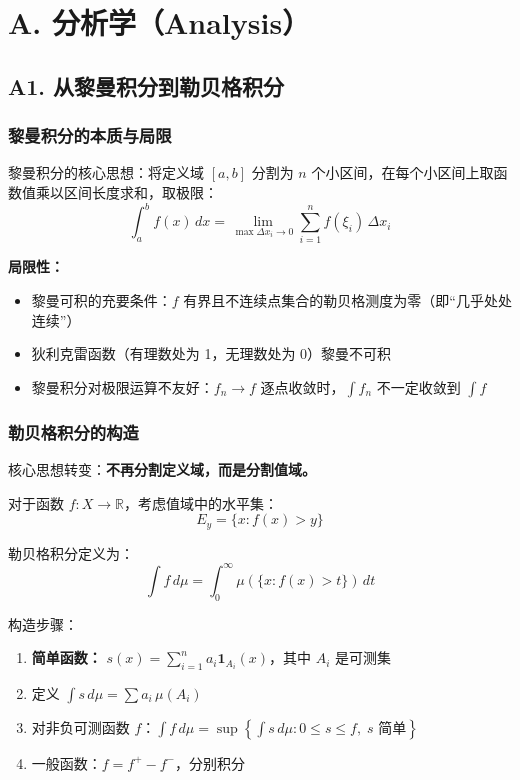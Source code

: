 \section{A. 分析学（Analysis）}

\subsection{A1. 从黎曼积分到勒贝格积分}

\subsubsection{黎曼积分的本质与局限}

黎曼积分的核心思想：将定义域 $[a,b]$ 分割为 $n$ 个小区间，在每个小区间上取函数值乘以区间长度求和，取极限：
\[
\int_a^b f(x)\,dx = \lim_{\max \Delta x_i \to 0} \sum_{i=1}^n f(\xi_i)\,\Delta x_i
\]

\textbf{局限性：}
\begin{itemize}
  \item 黎曼可积的充要条件：$f$ 有界且不连续点集合的勒贝格测度为零（即“几乎处处连续”）
  \item 狄利克雷函数（有理数处为 1，无理数处为 0）黎曼不可积
  \item 黎曼积分对极限运算不友好：$f_n \to f$ 逐点收敛时，$\int f_n$ 不一定收敛到 $\int f$
\end{itemize}

\subsubsection{勒贝格积分的构造}

核心思想转变：\textbf{不再分割定义域，而是分割值域。}

对于函数 $f: X \to \mathbb{R}$，考虑值域中的水平集：
\[
E_y = \{x : f(x) > y\}
\]

勒贝格积分定义为：
\[
\int f\,d\mu = \int_0^\infty \mu(\{x: f(x) > t\})\,dt
\]

构造步骤：
\begin{enumerate}
  \item \textbf{简单函数：} $s(x) = \sum_{i=1}^n a_i \mathbf{1}_{A_i}(x)$，其中 $A_i$ 是可测集
  \item 定义 $\int s\,d\mu = \sum a_i\,\mu(A_i)$
  \item 对非负可测函数 $f$：$\int f\,d\mu = \sup\left\{\int s\,d\mu : 0 \leq s \leq f,\; s \text{ 简单}\right\}$
  \item 一般函数：$f = f^+ - f^-$，分别积分
\end{enumerate}

